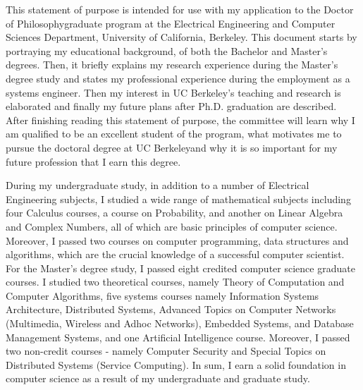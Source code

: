 \documentclass[a4paper,10pt]{report}
\newcommand{\university}{University of California, Berkeley}
\newcommand{\department}{Electrical Engineering and Computer Sciences Department}
\newcommand{\uniabbre}{UC Berkeley}
\newcommand{\degree}{Doctor of Philosophy}
\begin{document}

\vspace{0.4cm}
This statement of purpose is intended for use with my application to the \degree \space graduate program at the \department, \university. This document starts by portraying my educational background, of both the Bachelor and Master's degrees. Then, it briefly explains my research experience during the Master's degree study and states my professional experience during the employment as a systems engineer. Then my interest in \uniabbre's teaching and research is elaborated and finally my future plans after Ph.D. graduation are described. After finishing reading this statement of purpose, the committee will learn why I am qualified to be an excellent student of the program, what motivates me to pursue the doctoral degree at \uniabbre \space and why it is so important for my future profession that I earn this degree.

\vspace{0.2cm}
During my undergraduate study, in addition to a number of Electrical Engineering subjects, I studied a wide range of mathematical subjects including four Calculus courses, a course on Probability, and another on Linear Algebra and Complex Numbers, all of which are basic principles of computer science. Moreover, I passed two courses on computer programming, data structures and algorithms, which are the crucial knowledge of a successful computer scientist. For the Master's degree study, I passed eight credited computer science graduate courses. I studied two theoretical courses, namely Theory of Computation and Computer Algorithms, five systems courses namely Information Systems Architecture, Distributed Systems, Advanced Topics on Computer Networks (Multimedia, Wireless and Adhoc Networks), Embedded Systems, and Database Management Systems, and one Artificial Intelligence course. Moreover, I passed two non-credit courses - namely Computer Security and Special Topics on Distributed Systems (Service Computing). In sum, I earn a solid foundation in computer science as a result of my undergraduate and graduate study. 
\end{document}
